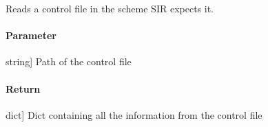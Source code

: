 \documentclass[letterpaper,10pt,english]{sphinxmanual}
\begin{document}
\begin{fulllineitems}
\label{\detokenize{functions:sir.read_control}}
\pysigstartsignatures
{}
\pysigstopsignatures
\sphinxAtStartPar
Reads a control file in the scheme SIR expects it.


\paragraph{Parameter}
\label{\detokenize{functions:id11}}\begin{description}
\sphinxlineitem{filename}{[}string{]}
\sphinxAtStartPar
Path of the control file

\end{description}


\paragraph{Return}
\label{\detokenize{functions:id12}}\begin{description}
\sphinxlineitem{Dict}{[}dict{]}
\sphinxAtStartPar
Dict containing all the information from the control file

\end{description}

\end{fulllineitems}

\end{document}
